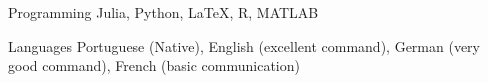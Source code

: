 

\begin{cvskills}

  \cvskill
    {Programming} %
    {Julia, Python, LaTeX, R, MATLAB} %

  \cvskill
    {Languages} %
    {Portuguese (Native), English (excellent command), 
    German (very good command), French (basic communication)} %

\end{cvskills}
